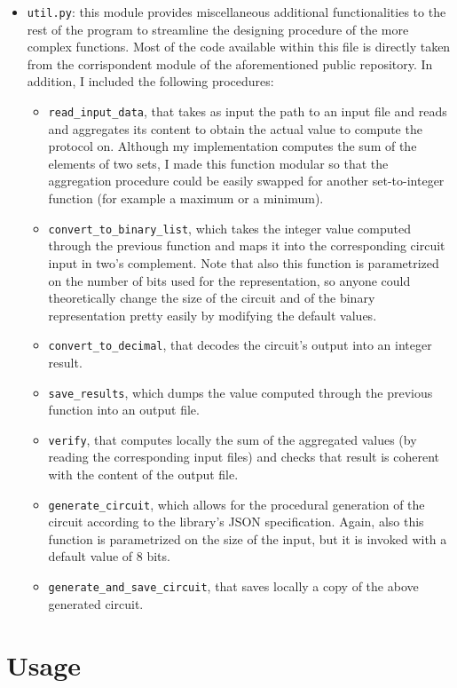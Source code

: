 \documentclass[12pt]{article}
\begin{document}
\begin{itemize}
  \item \texttt{util.py}: this module provides miscellaneous additional functionalities to the rest of the program to streamline the designing procedure of the more complex functions. Most of the code available within this file is directly taken from the corrispondent module of the aforementioned public repository. In addition, I included the following procedures:
  \begin{itemize}
    \item \texttt{read\_input\_data}, that takes as input the path to an input file and reads and aggregates its content to obtain the actual value to compute the protocol on. Although my implementation computes the sum of the elements of two sets, I made this function modular so that the aggregation procedure could be easily swapped for another set-to-integer function (for example a maximum or a minimum).
    \item \texttt{convert\_to\_binary\_list}, which takes the integer value computed through the previous function and maps it into the corresponding circuit input in two's complement. Note that also this function is parametrized on the number of bits used for the representation, so anyone could theoretically change the size of the circuit and of the binary representation pretty easily by modifying the default values.
    \item \texttt{convert\_to\_decimal}, that decodes the circuit's output into an integer result.
    \item \texttt{save\_results}, which dumps the value computed through the previous function into an output file.
    \item \texttt{verify}, that computes locally the sum of the aggregated values (by reading the corresponding input files) and checks that result is coherent with the content of the output file.
    \item \texttt{generate\_circuit}, which allows for the procedural generation of the circuit according to the library's JSON specification. Again, also this function is parametrized on the size of the input, but it is invoked with a default value of 8 bits.
    \item \texttt{generate\_and\_save\_circuit}, that saves locally a copy of the above generated circuit.
  \end{itemize} 
\end{itemize}

\section{Usage}\label{sec:running}
\end{document}
